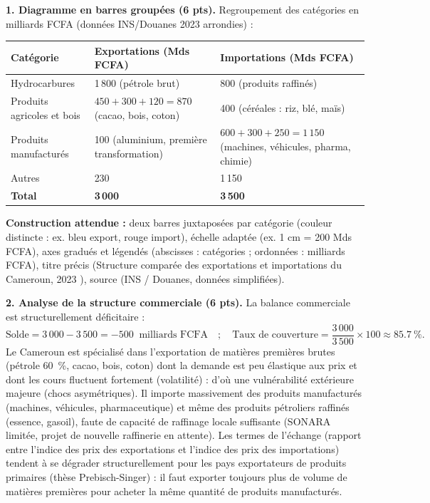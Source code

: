 \documentclass[11pt]{article}
\newcommand{\cle}[1]{{\popxbold\color{popdark}#1}}
\begin{document}
\begin{corrige}
\textbf{1. Diagramme en barres groupées (6 pts).} Regroupement des catégories en milliards FCFA (données INS/Douanes 2023 arrondies) :
\begin{center}
\begin{tabularx}{\linewidth}{|l|X|X|}\hline
\textbf{Catégorie} & \textbf{Exportations (Mds FCFA)} & \textbf{Importations (Mds FCFA)} \\ \hline
Hydrocarbures & 1\,800 (pétrole brut) & 800 (produits raffinés) \\ \hline
Produits agricoles et bois & $450+300+120 = 870$ (cacao, bois, coton) & 400 (céréales : riz, blé, maïs) \\ \hline
Produits manufacturés & 100 (aluminium, première transformation) & $600+300+250 = 1\,150$ (machines, véhicules, pharma, chimie) \\ \hline
Autres & 230 & 1\,150 \\ \hline
\textbf{Total} & \textbf{3\,000} & \textbf{3\,500} \\ \hline
\end{tabularx}
\end{center}
\textbf{Construction attendue :} deux barres juxtaposées par catégorie (couleur distincte : ex. bleu export, rouge import), échelle adaptée (ex. 1 cm = 200 Mds FCFA), axes gradués et légendés (abscisses : catégories ; ordonnées : milliards FCFA), titre précis (\og Structure comparée des exportations et importations du Cameroun, 2023 \fg), source (INS / Douanes, données simplifiées).

\textbf{2. Analyse de la structure commerciale (6 pts).} La balance commerciale est structurellement déficitaire :
\[ \text{Solde} = 3\,000 - 3\,500 = -\SI{500}{\text{ milliards FCFA}} \quad ; \quad \text{Taux de couverture} = \frac{3\,000}{3\,500}\times100 \approx \SI{85,7}{\%}. \]
Le Cameroun est spécialisé dans l'exportation de \cle{matières premières brutes} (pétrole \SI{60}{\%}, cacao, bois, coton) dont la demande est peu élastique aux prix et dont les cours fluctuent fortement (volatilité) : d'où une \cle{vulnérabilité} extérieure majeure (chocs asymétriques). Il importe massivement des produits manufacturés (machines, véhicules, pharmaceutique) et même des produits pétroliers raffinés (essence, gasoil), faute de capacité de raffinage locale suffisante (SONARA limitée, projet de nouvelle raffinerie en attente). Les \cle{termes de l'échange} (rapport entre l'indice des prix des exportations et l'indice des prix des importations) tendent à se dégrader structurellement pour les pays exportateurs de produits primaires (thèse Prebisch-Singer) : il faut exporter toujours plus de volume de matières premières pour acheter la même quantité de produits manufacturés.


\end{corrige}
\end{document}
